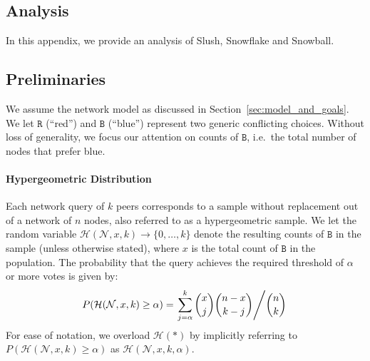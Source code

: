\documentclass[letterpaper,twocolumn,10pt]{article}
\theoremstyle{definition}
\begin{document}


\begin{appendices}
\section{Analysis}
\label{sec:full-analysis}
In this appendix, we provide an analysis of Slush, Snowflake and Snowball.

\subsection{Preliminaries}
We assume the network model as discussed in Section~\ref{sec:model_and_goals}. We let $\mathtt{R}$ (``red'') and $\mathtt{B}$ (``blue'') represent two generic conflicting choices.
Without loss of generality, we focus our attention on counts of $\mathtt{B}$, i.e.\ the total number of nodes that prefer blue.

\paragraph{Hypergeometric Distribution} Each network query of $k$ peers corresponds to a sample without replacement out of a network of $n$ nodes, also referred to as a hypergeometric sample.
We let the random variable $\mathcal{H}(\mathcal{N}, x, k) \rightarrow \{0, \dots, k\}$ denote the resulting counts of $\mathtt{B}$ in the sample (unless otherwise stated), where $x$ is the total count of $\mathtt{B}$ in the population. The probability that the query achieves the required threshold of $\alpha$ or more votes is given by:
\begin{equation}
\small
P(\mathcal{H}(\mathcal{N}, x, k) \geq \alpha) = \left.\sum_{j = \alpha}^{k} {x \choose j} {n - x \choose k - j} \middle/ {n \choose k}\right.
\label{eq:hypergeometric}
\end{equation}
For ease of notation, we overload $\mathcal{H}(*)$ by implicitly referring to $P(\mathcal{H}(\mathcal{N}, x, k) \geq \alpha)$ as $\mathcal{H}(\mathcal{N}, x, k, \alpha)$. 


\end{appendices}
\end{document}
